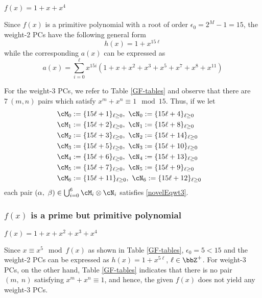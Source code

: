 \begin{example}	$f(x)= 1+x+x^4~$
	
	Since $f(x)$ is a primitive polynomial with a root of order $\epsilon_0=2^M-1=15$, the weight-2 PCs have the following general form
	$$h(x)=1+x^{15\ell}$$
	while the corresponding $a(x)$ can be expressed as 
	$$ a(x) = \sum_{i=0}^{\ell} x^{15i} \left(1 +x +x^2 +x^3+x^5+x^7+x^8+x^{11} \right)$$
	
	For the weight-3 PCs, we refer to Table \ref{GF-tables} and observe that there are $7~(m,n)$ pairs which satisfy $x^m+x^n \equiv 1 \mod 15$. Thus, if we let
	\begin{align}
	\cM_0 &:= \{15\ell + 1\}_{\ell \geq 0},~\cN_0 := \{15\ell + 4\}_{\ell \geq 0}\cr
	\cM_1 &:= \{15\ell + 2\}_{\ell \geq 0},~\cN_1 := \{15\ell + 8\}_{\ell \geq 0}\cr
	\cM_2 &:= \{15\ell + 3\}_{\ell \geq 0},~\cN_2 := \{15\ell + 14\}_{\ell \geq 0}\cr
	\cM_3 &:= \{15\ell + 5\}_{\ell \geq 0},~\cN_3 := \{15\ell + 10\}_{\ell \geq 0}\cr
	\cM_4 &:= \{15\ell + 6\}_{\ell \geq 0},~\cN_4 := \{15\ell + 13\}_{\ell \geq 0}\cr
	\cM_5 &:= \{15\ell + 7\}_{\ell \geq 0},~\cN_5 := \{15\ell + 9\}_{\ell \geq 0}\cr
	\cM_6 &:= \{15\ell + 11\}_{\ell \geq 0},~\cN_6 := \{15\ell + 12\}_{\ell \geq 0}
	\end{align}
	each pair $(\alpha,~\beta) \in \bigcup_{i=0}^6 \cM_i\otimes\cN_i$ satisfies \eqref{novelEqwt3}.
	\label{Ex:2}	
\end{example}

\subsubsection{$f(x)$ is a prime but primitive polynomial}

\begin{example}
$f(x)=1+x+x^2+x^3+x^4$

Since $x\equiv x^5 \mod f(x)$ as shown in Table \ref{GF-tables}, $\epsilon_0=5< 15$ and the weight-2 PCs can be expressed as $h(x)=1+x^{5\ell}$, $\ell \in \bbZ^+$. For weight-3 PCs, on the other hand, Table \ref{GF-tables} indicates that there is no pair $(m,~n)$ satisfying $x^m+x^n \equiv 1$, and hence, the given $f(x)$ does not yield any weight-3 PCs.
\label{Ex:3}
\end{example}

